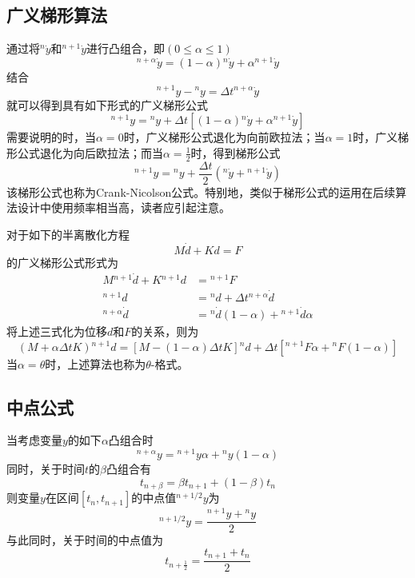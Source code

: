 \subsection{广义梯形算法}
通过将${^n\!\dot{y}}$和${^{n+1}\!\dot{y}}$进行凸组合\cite{Hughes2000c,Wood1990e}，即$(0\le\alpha\le1)$
\begin{equation}
{^{n+\alpha}\!\dot{y}}=(1-\alpha){^n\!\dot{y}}+\alpha{^{n+1}\!\dot{y}}
\end{equation}
结合
\begin{equation}
{^{n+1}\!y}-{^n\!y}=\Delta t{^{n+\alpha}\!\dot{y}}
\end{equation}
就可以得到具有如下形式的广义梯形公式
\begin{equation}
{^{n+1}\!y}={^n\!y}+\Delta t[(1-\alpha){^n\!\dot{y}}+\alpha{^{n+1}\!\dot{y}}]
\end{equation}
需要说明的时，当$\alpha=0$时，广义梯形公式退化为向前欧拉法；当$\alpha=1$时，广义梯形公式退化为向后欧拉法；而当$\alpha=\frac12$时，得到梯形公式
\begin{equation}
{^{n+1}\!y}={^n\!y}+\frac{\Delta t}{2}({^n\!\dot{y}}+{^{n+1}\!\dot{y}})
\end{equation}
该梯形公式也称为Crank-Nicolson公式。特别地，类似于梯形公式的运用在后续算法设计中使用频率相当高，读者应引起注意。

对于如下的半离散化方程
\begin{equation}
M\dot{d}+Kd=F
\end{equation}
的广义梯形公式形式为
\begin{align}
M{^{n+1}\!\dot{d}}+K{^{n+1}\!d}&={^{n+1}\!F}\\
{^{n+1}\!d}&={^n\!d}+\Delta t{^{n+\alpha}\!\dot{d}}\\
{^{n+\alpha}\!\dot{d}}&={^n\!\dot{d}}(1-\alpha)+{^{n+1}\!\dot{d}}\alpha
\end{align}
将上述三式化为位移$d$和$F$的关系，则为
\begin{equation}
(M+\alpha\Delta tK){^{n+1}\!d}=[M-(1-\alpha)\Delta tK]{^n\!d}+\Delta t[{^{n+1}\!F}\alpha+{^n\!F}(1-\alpha)]
\end{equation}
当$\alpha=\theta$时，上述算法也称为$\theta$-格式\cite{Wood1990e}。
\subsection{中点公式}
当考虑变量$y$的如下$\alpha$凸组合时
\begin{equation}
{^{n+\alpha}\!y}={^{n+1}\!y}\alpha+{^n\!y}(1-\alpha)
\end{equation}
同时，关于时间$t$的$\beta$凸组合有
\begin{equation}
t_{n+\beta}=\beta t_{n+1}+(1-\beta)t_n
\end{equation}
则变量$y$在区间$[t_n,t_{n+1}]$的中点值${^{n+1/2}\!y}$为
\begin{equation}
{^{n+1/2}\!y}=\frac{{^{n+1}\!y}+{^n\!y}}{2}
\end{equation}
与此同时，关于时间的中点值为
\begin{equation}
t_{n+\frac{1}{2}}=\frac{t_{n+1}+t_n}{2}
\end{equation}

